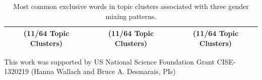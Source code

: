 \documentclass{pnastwo}
\begin{document}
\begin{article}
\begin{table}
\begin{tabular}{m{2.2in}|m{2.2in}|m{2.2in}}
		\midrule 
				\multicolumn{1}{c}{(11/64 Topic Clusters)} &  \multicolumn{1}{c}{(11/64 Topic Clusters)}  & \multicolumn{1}{c}{(11/64 Topic Clusters)}\\
		\bottomrule
	\end{tabular}
	\caption{\label{tab:top words} Most common exclusive words in topic clusters associated with three gender mixing patterns.}
\end{table}



\begin{acknowledgments}
This work was supported by US National Science Foundation Grant CISE-1320219 (Hanna Wallach and Bruce A. Desmarais, PIs)
\vspace{-.5cm}
\end{acknowledgments}




\end{article}
\end{document}
